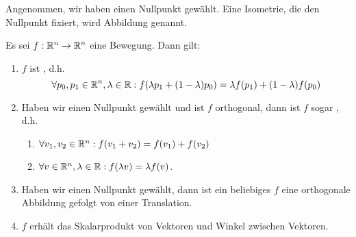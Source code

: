 \begin{definition}
Angenommen, wir haben einen Nullpunkt gewählt. Eine Isometrie, die den Nullpunkt fixiert, wird  Abbildung genannt.
\end{definition}

\begin{theorem}
Es sei $f:\mathbb{R}^n\to\mathbb{R}^n$ eine Bewegung. Dann gilt:
\begin{enumerate}
\item $f$ ist , d.h.
\[\forall p_0,p_1\in\mathbb{R}^n, \lambda\in\mathbb{R}: f(\lambda p_1 + (1-\lambda)p_0) = \lambda f(p_1)+(1-\lambda)f(p_0)\]
\item Haben wir einen Nullpunkt gewählt und ist $f$ orthogonal, dann ist $f$ sogar , d.h.
\begin{enumerate}
\item $\forall v_1,v_2\in\mathbb{R}^n: f(v_1+v_2)=f(v_1)+f(v_2)$
\item $\forall v\in\mathbb{R}^n, \lambda\in\mathbb{R}: f(\lambda v)=\lambda f(v)$.
\end{enumerate}
\item Haben wir einen Nullpunkt gewählt, dann ist ein beliebiges $f$ eine orthogonale Abbildung gefolgt von einer Translation.
\item $f$ erhält das Skalarprodukt von Vektoren und Winkel zwischen Vektoren.
\end{enumerate}
\end{theorem}
